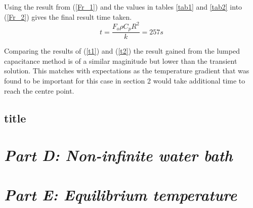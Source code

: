 \documentclass[11pt]{article}
\begin{document}
Using the result from (\ref{Fr_1}) and the values in tables \ref{tab1} and \ref{tab2} into (\ref{Fr_2}) gives the final result time taken.
\boldmath
\begin{equation}\label{t2}
	t = \frac{F_{o}\rho C_{p} R^{2}}{k} = 257 s
\end{equation}
\unboldmath

Comparing the results of (\ref{t1}) and (\ref{t2}) the result gained from the lumped capacitance method is of a similar maginitude but lower than the transient solution. This matches with expectations as the temperature gradient that was found to be important for this case in section 2 would take additional time to reach the centre point.

\subsection{title}

\section{\emph{Part D: Non-infinite water bath}}

\section{\emph{Part E: Equilibrium temperature}}



\end{document}
